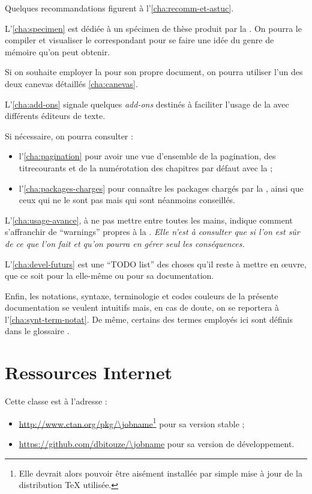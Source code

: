 Quelques recommandations figurent à l'\vref{cha:recomm-et-astuc}.

L'\vref{cha:specimen} est dédiée à un spécimen de thèse produit par la
\yatcl{}. On pourra le compiler et visualiser le  correspondant pour
se faire une idée du genre de mémoire qu'on peut obtenir.

Si on souhaite employer la \yatcl{} pour son propre document, on pourra
utiliser l'un des deux canevas détaillés \vref{cha:canevas}.

L'\vref{cha:add-ons} signale quelques \emph{add-ons} destinés à faciliter
l'usage de la \yatcl{} avec différents éditeurs de texte.

Si nécessaire, on pourra consulter :
\begin{itemize}
\item l'\vref{cha:pagination} pour avoir une vue d'ensemble de la
  \gls{pagination}, des \glspl{titrecourant} et de la numérotation des
  chapitres par défaut avec la \yatcl{} ;
\item l'\vref{cha:packages-charges} pour connaître les packages chargés par la
  \yatcl{}, ainsi que ceux qui ne le sont pas mais qui sont néanmoins
  conseillés.
\end{itemize}

L'\vref{cha:usage-avance}, à ne pas mettre entre toutes les mains, indique
comment s'affranchir de \foreignquote{english}{warnings} propres à la
\yatcl{}. \emph{Elle n'est à consulter que si l'on est sûr de ce que l'on fait et
qu'on pourra en gérer \emph{seul} les conséquences.}

L'\vref{cha:devel-futurs} est une \foreignquote{english}{TODO list} des choses
qu'il reste à mettre en œuvre, que ce soit pour la \yatcl{} elle-même ou pour
sa documentation.

Enfin, les notations, syntaxe, terminologie et codes couleurs de la présente
documentation se veulent intuitifs mais, en cas de doute, on se reportera
à l'\vref{cha:synt-term-notat}. De même, certains des termes employés ici sont
définis dans le glossaire .

\section{Ressources Internet}
\label{sec:ressources-internet}

Cette classe est  à l'adresse :
\begin{itemize}
\item \url{http://www.ctan.org/pkg/\jobname}\footnote{Elle
    devrait alors pouvoir être aisément installée par simple mise à jour de la
    distribution \TeX{} utilisée.} pour sa version stable ;
\item \url{https://github.com/dbitouze/\jobname} pour sa version de
  développement.
\end{itemize}


